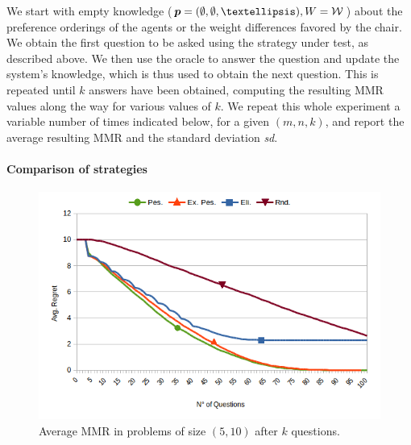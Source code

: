 \documentclass[sigconf, anonymous]{aamas}
\begin{document}
We start with empty knowledge ($\pprofile = (\emptyset, \emptyset, …), W = \W$) about the preference orderings of the agents or the weight differences favored by the chair. We obtain the first question to be asked using the strategy under test, as described above. We then use the oracle to answer the question and update the system's knowledge, which is thus used to obtain the next question. This is repeated until $k$ answers have been obtained, computing the resulting MMR values along the way for various values of $k$. We repeat this whole experiment a variable number of times indicated below, for a given $(m, n, k)$, and report the average resulting MMR and the standard deviation \textit{sd}.

\paragraph{Comparison of strategies}
\begin{figure}
	\caption{Average MMR in problems of size $(5, 10)$ after $k$ questions.}
	\label{fig:smallSize}
	\includegraphics[width=.45\textwidth]{comparison.png}
\end{figure}
\end{document}
